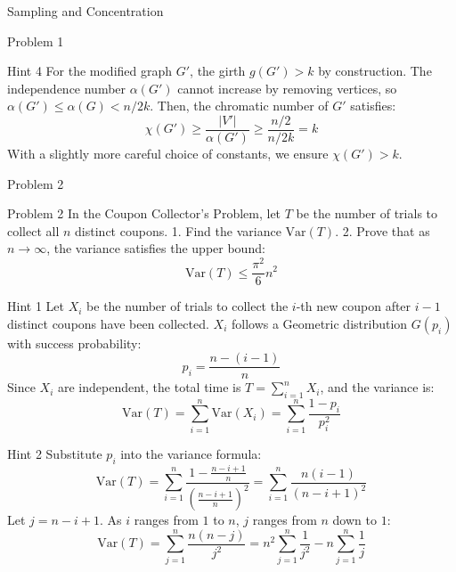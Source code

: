 \documentclass{beamer}
\begin{document}
\begin{section}{Sampling and Concentration}
\begin{subsection}{Problem 1}
    \begin{frame}
        \begin{block}{Hint 4}
            For the modified graph $G'$, the girth $g(G') > k$ by construction. 
            The independence number $\alpha(G')$ cannot increase by removing vertices, so $\alpha(G') \le \alpha(G) < n/2k$. 
            Then, the chromatic number of $G'$ satisfies:
            \[
                \chi(G') \ge \frac{|V'|}{\alpha(G')} \ge \frac{n/2}{n/2k} = k
            \]
            With a slightly more careful choice of constants, we ensure $\chi(G') > k$.
        \end{block}
    \end{frame}
\end{subsection}

\begin{subsection}{Problem 2}
    \begin{frame}
        \begin{block}{Problem 2}
            In the Coupon Collector's Problem, let $T$ be the number of trials to collect all $n$ distinct coupons. 
            1. Find the variance $\text{Var}(T)$.
            2. Prove that as $n \to \infty$, the variance satisfies the upper bound:
            \[
                \text{Var}(T) \le \frac{\pi^2}{6} n^2
            \]
        \end{block}
    \end{frame}

    \begin{frame}
        \begin{block}{Hint 1}
            Let $X_i$ be the number of trials to collect the $i$-th new coupon after $i-1$ distinct coupons have been collected. 
            $X_i$ follows a Geometric distribution $G(p_i)$ with success probability:
            \[
                p_i = \frac{n - (i-1)}{n}
            \]
            Since $X_i$ are independent, the total time is $T = \sum_{i=1}^n X_i$, and the variance is:
            \[
                \text{Var}(T) = \sum_{i=1}^n \text{Var}(X_i) = \sum_{i=1}^n \frac{1 - p_i}{p_i^2}
            \]
        \end{block}
    \end{frame}

    \begin{frame}
        \begin{block}{Hint 2}
            Substitute $p_i$ into the variance formula:
            \[
                \text{Var}(T) = \sum_{i=1}^n \frac{1 - \frac{n-i+1}{n}}{\left(\frac{n-i+1}{n}\right)^2} = \sum_{i=1}^n \frac{n(i-1)}{(n-i+1)^2}
            \]
            Let $j = n-i+1$. As $i$ ranges from $1$ to $n$, $j$ ranges from $n$ down to $1$:
            \[
                \text{Var}(T) = \sum_{j=1}^n \frac{n(n-j)}{j^2} = n^2 \sum_{j=1}^n \frac{1}{j^2} - n \sum_{j=1}^n \frac{1}{j}
            \]
        \end{block}
    \end{frame}


\end{subsection}
\end{section}
\end{document}
